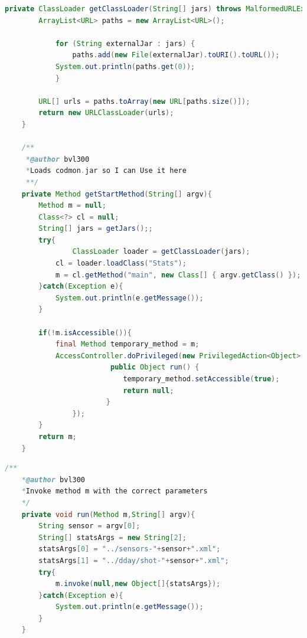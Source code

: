 \documentclass{article}
\begin{document}
\begin{lstlisting}[frame=single ,language=Java]
private ClassLoader getClassLoader(String[] jars) throws MalformedURLException, SecurityException{
		ArrayList<URL> paths = new ArrayList<URL>();

     		for (String externalJar : jars) {
         		paths.add(new File(externalJar).toURI().toURL());
			System.out.println(paths.get(0));
     		}
     		
		URL[] urls = paths.toArray(new URL[paths.size()]);
		return new URLClassLoader(urls);
	}	

	/**
	 *@author bvl300
	 *Loads codmon.jar so I can Use it here
	 **/
	private Method getStartMethod(String[] argv){	
		Method m = null;
		Class<?> cl = null;
		String[] jars = getJars();;
		try{
		        ClassLoader loader = getClassLoader(jars);
			cl = loader.loadClass("Stats");
			m = cl.getMethod("main", new Class[] { argv.getClass() });
		}catch(Exception e){
			System.out.println(e.getMessage());
		}

		if(!m.isAccessible()){
			final Method temporary_method = m;
			AccessController.doPrivileged(new PrivilegedAction<Object>() {
            			 public Object run() {
               		  		temporary_method.setAccessible(true);
                 			return null;
             			}
         		});
		}
		return m;
	} 
\end{lstlisting} 
\newpage
{}
\begin{lstlisting}[frame=single ,language=Java]
	/**
 	*@author bvl300
 	*Invoke method m with the correct parameters
 	*/ 
	private void run(Method m,String[] argv){
		String sensor = argv[0];
		String[] statsArgs = new String[2];
		statsArgs[0] = "../sensors-"+sensor+".xml";
		statsArgs[1] = "../dday/shot-"+sensor+".xml";
		try{
			m.invoke(null,new Object[]{statsArgs});
		}catch(Exception e){
			System.out.println(e.getMessage());
		}
	}
\end{lstlisting}  
\end{document}
